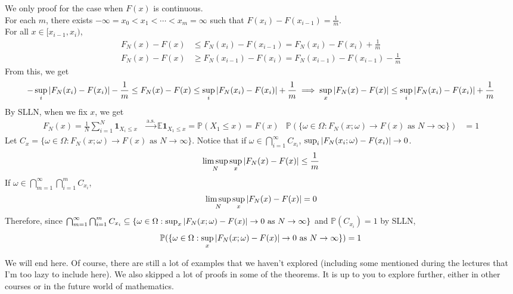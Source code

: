 \documentclass{huhtakm-template-book}
\newcommand{\prob}{\mathbb{P}}
\newcommand{\expect}{\mathbb{E}}
\begin{document}
    \begin{proofing}
        We only proof for the case when $F(x)$ is continuous.\\
        For each $m$, there exists $-\infty=x_{0}<x_{1}<\cdots<x_{m}=\infty$ such that $F(x_{i})-F(x_{i-1})=\frac{1}{m}$.\\
        For all $x\in[x_{i-1},x_{i})$,
        \begin{align*}
            F_{N}(x)-F(x)&\leq F_{N}(x_{i})-F(x_{i-1})=F_{N}(x_{i})-F(x_{i})+\frac{1}{m}\\
            F_{N}(x)-F(x)&\geq F_{N}(x_{i-1})-F(x_{i})=F_{N}(x_{i-1})-F(x_{i-1})-\frac{1}{m}
        \end{align*}
        From this, we get
        \begin{equation*}
            -\sup_{i}\left|{F_{N}(x_{i})-F(x_{i})}\right|-\frac{1}{m}\leq F_{N}(x)-F(x)\leq\sup_{i}\left|{F_{N}(x_{i})-F(x_{i})}\right|+\frac{1}{m}\implies\sup_{x}\left|{F_{N}(x)-F(x)}\right|\leq\sup_{i}\left|{F_{N}(x_{i})-F(x_{i})}\right|+\frac{1}{m}
        \end{equation*}
        By SLLN, when we fix $x$, we get
        \begin{align*}
            F_{N}(x)=\frac{1}{N}\sum_{i=1}^{N}\mathbf{1}_{X_{i}\leq x}&\xrightarrow{\text{a.s.}}\expect\mathbf{1}_{X_{1}\leq x}=\prob(X_{1}\leq x)=F(x) & \prob(\{\omega\in\Omega:F_{N}(x;\omega)\to F(x)\text{ as }N\to\infty\})&=1
        \end{align*}
        Let $C_{x}=\{\omega\in\Omega:F_{N}(x;\omega)\to F(x)\text{ as }N\to\infty\}$. Notice that if $\omega\in\bigcap_{i=1}^{\infty}C_{x_{i}}$, $\sup_{i}\left|{F_{N}(x_{i};\omega)-F(x_{i})}\right|\to 0$.
        \begin{equation*}
            \limsup_{N}\sup_{x}\left|{F_{N}(x)-F(x)}\right|\leq\frac{1}{m}
        \end{equation*}
        If $\omega\in\bigcap_{m=1}^{\infty}\bigcap_{i=1}^{m}C_{x_{i}}$,
        \begin{equation*}
            \limsup_{N}\sup_{x}\left|{F_{N}(x)-F(x)}\right|=0
        \end{equation*}
        Therefore, since $\bigcap_{m=1}^{\infty}\bigcap_{i=1}^{m}C_{x_{i}}\subseteq\{\omega\in\Omega:\sup_{x}\left|{F_{N}(x;\omega)-F(x)}\right|\to 0\text{ as }N\to\infty\}$ and $\prob(C_{x_{i}})=1$ by SLLN,
        \begin{equation*}
            \prob(\{\omega\in\Omega:\sup_{x}\abs{F_{N}(x;\omega)-F(x)}\to 0\text{ as }N\to\infty\})=1
        \end{equation*}
    \end{proofing}
    We will end here. Of course, there are still a lot of examples that we haven't explored (including some mentioned during the lectures that I'm too lazy to include here). We also skipped a lot of proofs in some of the theorems. It is up to you to explore further, either in other courses or in the future world of mathematics.
\end{document}
